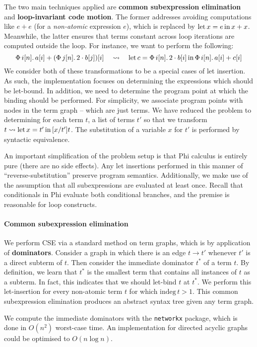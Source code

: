 The two main techniques applied are \textbf{common subexpression elimination} and \textbf{loop-invariant code motion}. The former addresses avoiding computations like $e + e$ (for a \textit{non-atomic} expression $e$), which is replaced by $\mathrm{let}\,{x}={e}\,\mathrm{in}\,{x + x}$. Meanwhile, the latter ensures that terms constant across loop iterations are computed outside the loop. For instance, we want to perform the following:
$$ 
\phivec{i}{n}{a[i] + \left( \phivec{j}{n}{2 \cdot b[j]} \right)[i]} \quad\leadsto\quad \philet{c}{\phivec{i}{n}{2 \cdot b[i]}}{\phivec{i}{n}{a[i] + c[i]}} 
$$
We consider both of these transformations to be a special cases of let insertion. As such, the implementation focuses on determining the expressions which should be let-bound. In addition, we need to determine the program point at which the binding should be performed. For simplicity, we associate program points with nodes in the term graph -- which are just terms. We have reduced the problem to determining for each term $t$, a list of terms $t'$ so that we transform $t \leadsto \mathrm{let}\,{x}={t'}\,\mathrm{in}\,{[x/t']t}$. The substitution of a variable $x$ for $t'$ is performed by syntactic equivalence.

An important simplification of the problem setup is that Phi calculus is entirely pure (there are no side effects). Any let insertions performed in this manner of ``reverse-substitution'' preserve program semantics. Additionally, we make use of the assumption that all subexpressions are evaluated at least once. Recall that conditionals in Phi evaluate both conditional branches, and the premise is reasonable for loop constructs.

\paragraph{Common subexpression elimination} We perform CSE via a standard method on term graphs, which is by application of \textbf{dominators}. Consider a graph in which there is an edge $t \to t'$ whenever $t'$ is a direct subterm of $t$. Then consider the immediate dominator $t^*$ of a term $t$. By definition, we learn that $t^*$ is the smallest term that contains all instances of $t$ as a subterm. In fact, this indicates that we should let-bind $t$ at $t^*$. We perform this let-insertion for every non-atomic term $t$ for which $\mathrm{indeg}\,t > 1$. This common subexpression elimination produces an abstract syntax tree given any term graph.

We compute the immediate dominators with the \texttt{networkx} package, which is done in $O(n^2)$ worst-case time. An implementation for directed acyclic graphs could be optimised to $O(n \log n)$.

